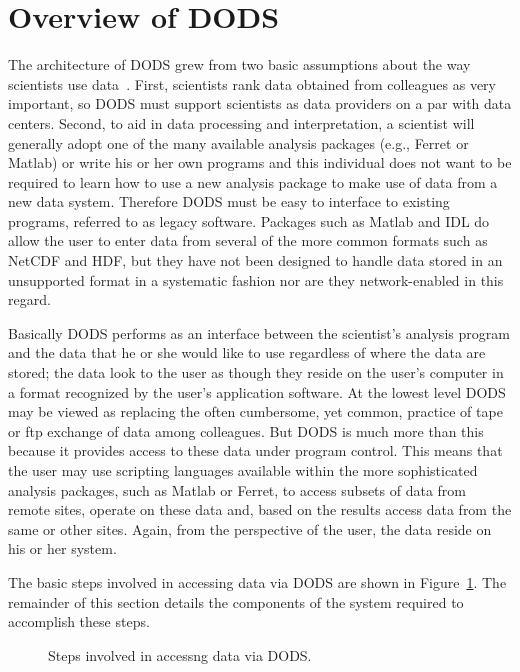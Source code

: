 \documentclass{article}
\begin{document}
\section{Overview of \ac{DODS}}
\label{overview}

The architecture of \ac{DODS} grew from two basic assumptions about 
the way scientists use data~\cite{dods:workshop1}. First, scientists 
rank data obtained from colleagues as very important, so \ac{DODS} 
must support scientists as data providers on a par with data centers. 
Second, to aid in data processing and interpretation, a scientist will 
generally adopt one of the many available analysis packages (e.g., 
Ferret or Matlab) or write his or her own programs and this individual
does not want to be required to learn how to use a new analysis package 
to make use of data from a new data system. Therefore \ac{DODS} must 
be easy to interface to existing programs, referred to as legacy 
software. Packages such as Matlab and IDL do allow the user to enter
data from several of the more common formats such as NetCDF and HDF,
but they have not been designed to handle data stored in an unsupported
format in a systematic fashion nor are they network-enabled
in this regard.

Basically \ac{DODS} performs as an interface between the scientist's 
analysis program and the data that he or she would like to use 
regardless of where the data are stored; the data look to the user as 
though they reside on the user's computer in a format recognized by 
the user's application software. At the lowest level \ac{DODS} may 
be viewed as replacing the often cumbersome, yet common, practice 
of tape or ftp exchange of data among colleagues. But \ac{DODS} is 
much more than this because it provides access to these data under 
program control. This means that the user may use scripting languages 
available within the more sophisticated analysis packages, such as 
Matlab or Ferret, to access subsets of data from remote sites, operate 
on these data and, based on the results access data from the same or 
other sites. Again, from the perspective of the user, the data reside 
on his or her system.

The basic steps involved in accessing data via \ac{DODS} are shown 
in Figure~\ref{fig:schematic}. The remainder of this section details
the components of the system required to accomplish these steps.

\begin{figure}[htbp]
\begin{center}
\caption{Steps involved in accessng data via DODS.}
\label{fig:schematic}
\end{center}
\end{figure}
\end{document}
